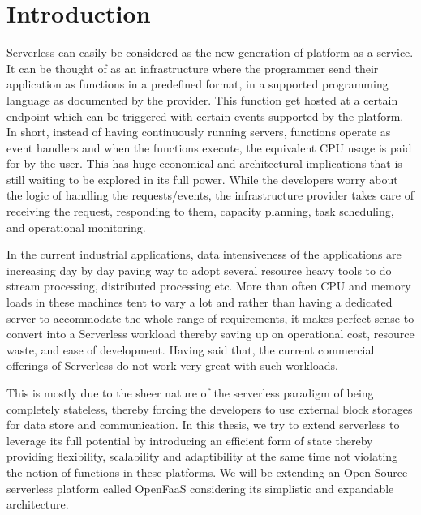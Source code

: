 \documentclass[12pt]{article}
\begin{document}
\section{Introduction}
\label{sec:org8d6a029}

Serverless can easily be considered as the new generation of platform as a
service. It can be thought of as an infrastructure where the programmer send
their application as functions in a predefined format, in a supported
programming language as documented by the provider. This function get hosted at
a certain endpoint which can be triggered with certain events supported by the
platform. In short, instead of having continuously running servers, functions operate as
event handlers and when the functions execute, the equivalent CPU usage is paid
for by the user. This has huge economical and architectural implications that is
still waiting to be explored in its full power. While the developers worry about
the logic of handling the requests/events, the infrastructure provider takes
care of receiving the request, responding to them, capacity planning, task
scheduling, and operational monitoring\cite{gotoconf}.

In the current industrial applications, data intensiveness of the applications are increasing
day by day paving way to adopt several resource heavy tools to do stream
processing, distributed processing etc. More than often CPU and memory loads in
these machines tent to vary a lot and rather than having a dedicated server to accommodate the whole range
of requirements, it makes perfect sense to convert into a Serverless workload
thereby saving up on operational cost, resource waste, and ease of development.
Having said that, the current commercial offerings of Serverless do not work
very great with such workloads.

This is mostly due to the sheer
nature of the serverless paradigm of being completely stateless, thereby forcing
the developers to use external block storages for data store and communication.
In this thesis, we try to extend serverless to leverage its full potential by
introducing an efficient form of state thereby providing flexibility, scalability and
adaptibility at the same time not violating the notion of functions in these platforms.
We will be extending an Open Source serverless platform called OpenFaaS
considering its simplistic and expandable architecture.
\end{document}
